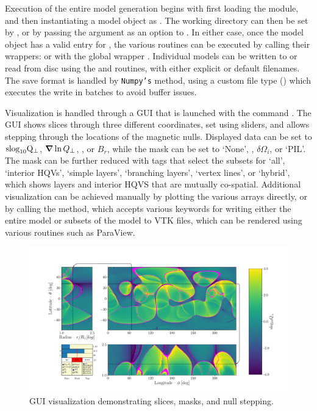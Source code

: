 \documentclass[10pt]{aastex62}
\newcommand{\grad}{\mbox{\boldmath$\nabla$}}
\begin{document}
\begin{itemize}
Execution of the entire model generation begins with first loading the module, and then instantiating a model object as .
The working directory can then be set by , or by passing the argument  as an option to . 
In either case, once the model object has a valid entry for , the various routines can be executed by calling their wrappers:  or with the global wrapper . 
Individual models can be written to or read from disc using the  and  routines, with either explicit or default filenames.
The save format is handled by \texttt{Numpy's}  method, using a custom file type () which executes the write in batches to avoid buffer issues.

Visualization is handled through a GUI that is launched with the command .
The GUI shows slices through three different coordinates, set using sliders, and allows stepping through the locations of the magnetic nulls.
Displayed data can be set to $\rm{slog}_{10}Q_\perp$, $\grad \ln Q_\perp$, , or $B_r$, while the mask can be set to `None', , $\delta \Omega_i$, or `PIL'.
The mask can be further reduced with tags that select the subsets for `all', `interior HQVs', `simple layers', `branching layers', `vertex lines', or `hybrid', which shows layers and interior HQVS that are mutually co-spatial.
Additional visualization can be achieved manually by plotting the various arrays directly, or by calling the  method, which accepts various keywords for writing either the entire model or subsets of the model to VTK files, which can be rendered using various routines such as ParaView. 

\begin{figure}
\center
\includegraphics[width=\linewidth]{./fig_src_fls/gui}
\caption{GUI visualization demonstrating slices, masks, and null stepping.}
\label{vis_opts.fig}
\end{figure}



\end{itemize}








\end{document}
